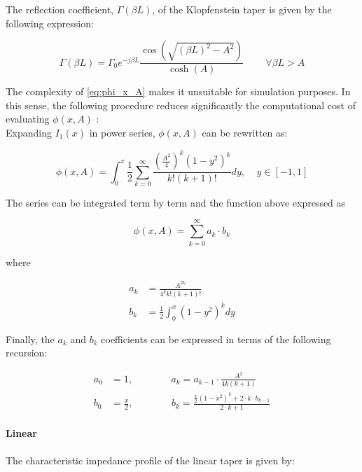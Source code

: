 \noindent The reflection coefficient, $\Gamma(\beta L)$, of the Klopfenstein taper is given by the following expression:

\begin{equation}
\Gamma(\beta L) = \Gamma_0 e^{-j \beta L} \frac{\cos \left (\sqrt{(\beta L)^2 - A^2} \right )}{\cosh(A)} \;\;\;\;\;\;\;\; \forall \beta L > A
\end{equation}

\noindent The complexity of \ref{eq:phi_x_A} makes it unsuitable for simulation purposes. In this sense, the following procedure reduces significantly the computational cost of evaluating $\phi(x, A)$ \cite{GrossbergKlopfensteinTaper}:\\

\noindent Expanding $I_1(x)$ in power series, $\phi(x, A)$ can be rewritten as:

\begin{equation}
\phi(x, A) = \int_0^x \frac{1}{2} \sum\limits_{k=0}^{\infty} \frac{\left( \frac{A^2}{4}\right)^{\! k} (1-y^2)^k}{k!(k+1)!} dy, \;\;\;\; y \in [-1, 1]
\end{equation}

\noindent The series can be integrated term by term and the function above expressed as

\begin{equation}
\phi(x, A) = \sum\limits_{k=0}^{\infty} a_k \cdot b_k
\end{equation}

\noindent where

\begin{align}
a_k & = \frac{A^{2k}}{4^k k! (k+1)!} \\
b_k & = \frac{1}{2} \int_{0}^{x} (1-y^2)^k dy
\end{align}

\noindent Finally, the $a_k$ and $b_k$ coefficients can be expressed in terms of the following recursion:


\begin{align}
a_0 & = 1,  \;\;\;\;\;\;\;\;\;\;\;\;\;\; a_k = a_{k-1} \cdot \frac{A^2}{4 k (k+1)} \\
b_0 & = \frac{x}{2}, \;\;\;\;\;\;\;\;\;\;\;\;\;\; b_k = \frac{\frac{x}{2} (1 - x^2)^k + 2 \cdot k \cdot b_{k-1}}{2 \cdot k + 1}
\end{align}

\paragraph{Linear}
The characteristic impedance profile of the linear taper is given by:

